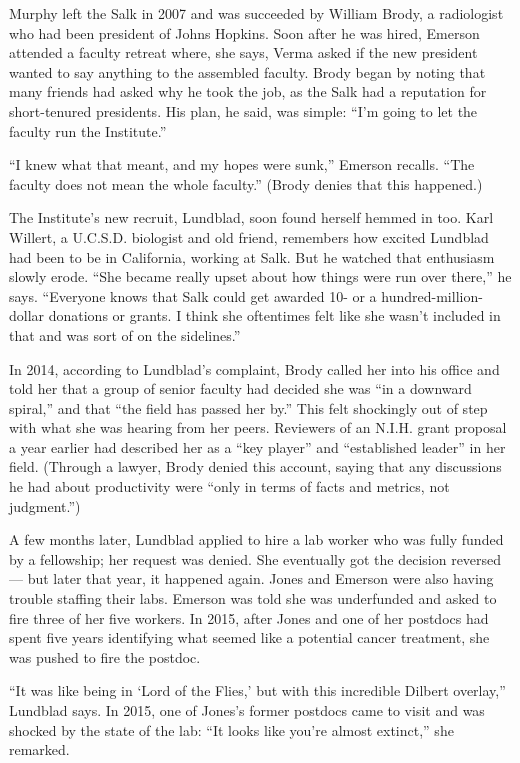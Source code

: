 Murphy left the Salk in 2007 and was succeeded by William Brody, a
radiologist who had been president of Johns Hopkins. Soon after he was
hired, Emerson attended a faculty retreat where, she says, Verma asked
if the new president wanted to say anything to the assembled faculty.
Brody began by noting that many friends had asked why he took the job,
as the Salk had a reputation for short-tenured presidents. His plan, he
said, was simple: ``I'm going to let the faculty run the Institute.''

``I knew what that meant, and my hopes were sunk,'' Emerson recalls.
``The faculty does not mean the whole faculty.'' (Brody denies that this
happened.)

The Institute's new recruit, Lundblad, soon found herself hemmed in too.
Karl Willert, a U.C.S.D. biologist and old friend, remembers how excited
Lundblad had been to be in California, working at Salk. But he watched
that enthusiasm slowly erode. ``She became really upset about how things
were run over there,'' he says. ``Everyone knows that Salk could get
awarded 10- or a hundred-million-dollar donations or grants. I think she
oftentimes felt like she wasn't included in that and was sort of on the
sidelines.''

In 2014, according to Lundblad's complaint, Brody called her into his
office and told her that a group of senior faculty had decided she was
``in a downward spiral,'' and that ``the field has passed her by.'' This
felt shockingly out of step with what she was hearing from her peers.
Reviewers of an N.I.H. grant proposal a year earlier had described her
as a ``key player'' and ``established leader'' in her field. (Through a
lawyer, Brody denied this account, saying that any discussions he had
about productivity were ``only in terms of facts and metrics, not
judgment.'')

A few months later, Lundblad applied to hire a lab worker who was fully
funded by a fellowship; her request was denied. She eventually got the
decision reversed --- but later that year, it happened again. Jones and
Emerson were also having trouble staffing their labs. Emerson was told
she was underfunded and asked to fire three of her five workers. In
2015, after Jones and one of her postdocs had spent five years
identifying what seemed like a potential cancer treatment, she was
pushed to fire the postdoc.

``It was like being in `Lord of the Flies,' but with this incredible
Dilbert overlay,'' Lundblad says. In 2015, one of Jones's former
postdocs came to visit and was shocked by the state of the lab: ``It
looks like you're almost extinct,'' she remarked.

